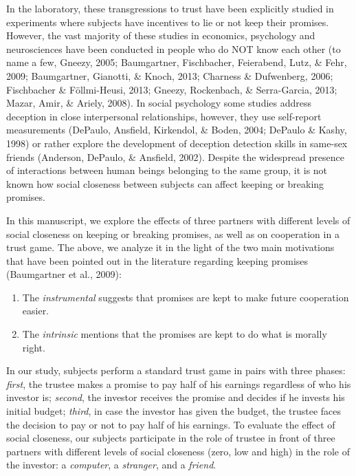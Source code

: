 \documentclass[12pt,]{article}
\begin{document}
In the laboratory, these transgressions to trust have been explicitly
studied in experiments where subjects have incentives to lie or not keep
their promises. However, the vast majority of these studies in
economics, psychology and neurosciences have been conducted in people
who do NOT know each other (to name a few, Gneezy, 2005; Baumgartner,
Fischbacher, Feierabend, Lutz, \& Fehr, 2009; Baumgartner, Gianotti, \&
Knoch, 2013; Charness \& Dufwenberg, 2006; Fischbacher \& Föllmi-Heusi,
2013; Gneezy, Rockenbach, \& Serra-Garcia, 2013; Mazar, Amir, \& Ariely,
2008). In social psychology some studies address deception in close
interpersonal relationships, however, they use self-report measurements
(DePaulo, Ansfield, Kirkendol, \& Boden, 2004; DePaulo \& Kashy, 1998)
or rather explore the development of deception detection skills in
same-sex friends (Anderson, DePaulo, \& Ansfield, 2002). Despite the
widespread presence of interactions between human beings belonging to
the same group, it is not known how social closeness between subjects
can affect keeping or breaking promises.

In this manuscript, we explore the effects of three partners with
different levels of social closeness on keeping or breaking promises, as
well as on cooperation in a trust game. The above, we analyze it in the
light of the two main motivations that have been pointed out in the
literature regarding keeping promises (Baumgartner et al., 2009):

\begin{enumerate}
\def\labelenumi{\arabic{enumi}.}
\item
  The \emph{instrumental} suggests that promises are kept to make future
  cooperation easier.
\item
  The \emph{intrinsic} mentions that the promises are kept to do what is
  morally right.
\end{enumerate}

In our study, subjects perform a standard trust game in pairs with three
phases: \emph{first}, the trustee makes a promise to pay half of his
earnings regardless of who his investor is; \emph{second}, the investor
receives the promise and decides if he invests his initial budget;
\emph{third}, in case the investor has given the budget, the trustee
faces the decision to pay or not to pay half of his earnings. To
evaluate the effect of social closeness, our subjects participate in the
role of trustee in front of three partners with different levels of
social closeness (zero, low and high) in the role of the investor: a
\emph{computer}, a \emph{stranger}, and a \emph{friend}.
\end{document}
